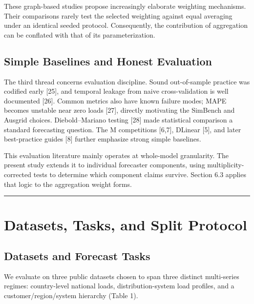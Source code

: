 \documentclass[electronics,article,submit,moreauthors]{Definitions/mdpi}
\begin{document}
These graph-based studies propose increasingly elaborate weighting mechanisms. Their comparisons rarely test the selected weighting against equal averaging under an identical seeded protocol. Consequently, the contribution of aggregation can be conflated with that of its parameterization.

\subsection{Simple Baselines and Honest Evaluation}\label{simple-baselines-and-honest-evaluation}

The third thread concerns evaluation discipline. Sound out-of-sample practice was codified early {[}25{]}, and temporal leakage from naive cross-validation is well documented {[}26{]}. Common metrics also have known failure modes; MAPE becomes unstable near zero loads {[}27{]}, directly motivating the SimBench and Ausgrid choices. Diebold--Mariano testing {[}28{]} made statistical comparison a standard forecasting question. The M competitions {[}6,7{]}, DLinear {[}5{]}, and later best-practice guides {[}8{]} further emphasize strong simple baselines.

This evaluation literature mainly operates at whole-model granularity. The present study extends it to individual forecaster components, using multiplicity-corrected tests to determine which component claims survive. Section 6.3 applies that logic to the aggregation weight forms.

\begin{center}\rule{0.5\linewidth}{0.5pt}\end{center}

\section{Datasets, Tasks, and Split Protocol}\label{datasets-tasks-and-split-protocol}

\subsection{Datasets and Forecast Tasks}\label{datasets-and-forecast-tasks}

We evaluate on three public datasets chosen to span three distinct multi-series regimes: country-level national loads, distribution-system load profiles, and a customer/region/system hierarchy (Table 1).
\end{document}
